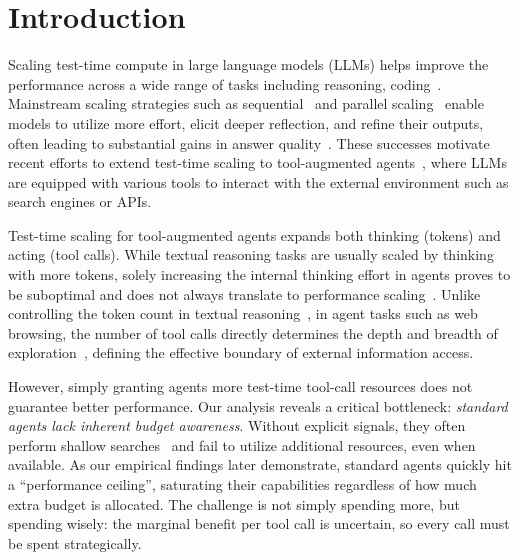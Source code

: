 \section{Introduction}


Scaling test-time compute in large language models (LLMs) helps improve the performance across a wide range of tasks including reasoning, coding~\citep{DBLP:conf/iclr/WuSLWY25,DBLP:journals/corr/abs-2408-03314, DBLP:journals/corr/abs-2501-19393, DBLP:journals/corr/abs-2501-19306}. 
Mainstream scaling strategies such as sequential~\citep{DBLP:conf/nips/MadaanTGHGW0DPY23} and parallel scaling~\citep{DBLP:conf/iclr/0002WSLCNCZ23,DBLP:journals/corr/abs-2407-21787} enable models to utilize more effort, elicit deeper reflection, and refine their outputs, often leading to substantial gains in answer quality~\citep{DBLP:journals/corr/abs-2503-24235}. These successes motivate recent efforts to extend test-time scaling to tool-augmented agents~\citep{DBLP:journals/corr/abs-2506-12928, DBLP:journals/corr/abs-2508-00890}, where LLMs are equipped with various tools to interact with the external environment such as search engines or APIs.



Test-time scaling for tool-augmented agents expands both thinking (tokens) and acting (tool calls). While textual reasoning tasks are usually scaled by thinking with more tokens, solely increasing the internal thinking effort in agents proves to be suboptimal and does not always translate to performance scaling~\citep{DBLP:journals/corr/abs-2506-07976}.
Unlike controlling the token count in textual reasoning~\citep{DBLP:conf/acl/HanWFZM025,DBLP:journals/corr/abs-2504-13367}, in agent tasks such as web browsing, the number of tool calls directly determines the depth and breadth of exploration~\citep{anthropic2025context, miromindteam2025mirothinkerpushingperformanceboundaries}, defining the effective boundary of external information access.





However, simply granting agents more test-time tool-call resources does not guarantee better performance. Our analysis reveals a critical bottleneck: \emph{standard agents lack inherent budget awareness}. Without explicit signals, they often perform shallow searches~\citep{lu2025deepdiveadvancingdeepsearch} and fail to utilize additional resources, even when available. As our empirical findings later demonstrate, standard agents quickly hit a ``performance ceiling'', saturating their capabilities regardless of how much extra budget is allocated.
The challenge is not simply spending more, but spending wisely: the marginal benefit per tool call is uncertain, so every call must be spent strategically.


